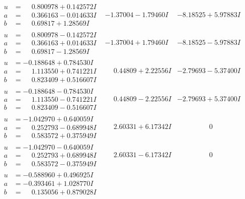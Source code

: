 \documentclass[1p]{elsarticle_modified}
\theoremstyle{definition}
\begin{document}
$$\begin{array}{c|c|c}
\begin{aligned}
u &= \phantom{-}0.800978 + 0.142572 I \\
a &= \phantom{-}0.366163 - 0.014633 I \\
b &= \phantom{-}0.69817 + 1.28569 I\end{aligned}
 & -1.37004 - 1.79460 I & -8.18525 + 5.97883 I \\ \hline\begin{aligned}
u &= \phantom{-}0.800978 - 0.142572 I \\
a &= \phantom{-}0.366163 + 0.014633 I \\
b &= \phantom{-}0.69817 - 1.28569 I\end{aligned}
 & -1.37004 + 1.79460 I & -8.18525 - 5.97883 I \\ \hline\begin{aligned}
u &= -0.188648 + 0.784530 I \\
a &= \phantom{-}1.113550 + 0.741221 I \\
b &= \phantom{-}0.823409 + 0.516607 I\end{aligned}
 & \phantom{-}0.44809 + 2.22556 I & -2.79693 - 5.37400 I \\ \hline\begin{aligned}
u &= -0.188648 - 0.784530 I \\
a &= \phantom{-}1.113550 - 0.741221 I \\
b &= \phantom{-}0.823409 - 0.516607 I\end{aligned}
 & \phantom{-}0.44809 - 2.22556 I & -2.79693 + 5.37400 I \\ \hline\begin{aligned}
u &= -1.042970 + 0.640059 I \\
a &= \phantom{-}0.252793 - 0.689948 I \\
b &= \phantom{-}0.583572 + 0.375949 I\end{aligned}
 & \phantom{-}2.60331 + 6.17342 I & \phantom{-0.000000 } 0 \\ \hline\begin{aligned}
u &= -1.042970 - 0.640059 I \\
a &= \phantom{-}0.252793 + 0.689948 I \\
b &= \phantom{-}0.583572 - 0.375949 I\end{aligned}
 & \phantom{-}2.60331 - 6.17342 I & \phantom{-0.000000 } 0 \\ \hline\begin{aligned}
u &= -0.588960 + 0.496925 I \\
a &= -0.393461 + 1.028770 I \\
b &= \phantom{-}0.135056 + 0.879028 I\end{aligned}

\end{array}$$
\end{document}
